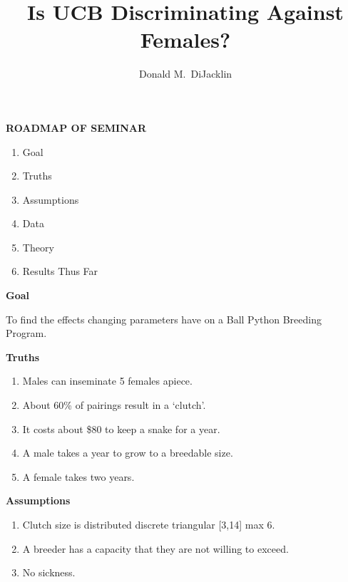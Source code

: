 \documentclass[grey,handout]{beamer}
\renewcommand{\frametitle}[1]{\begin{center}\textbf{#1}\end{center}}
\begin{document}
\title{Is UCB Discriminating Against Females?}

\author{Donald M.~DiJacklin}


\begin{frame}
  \titlepage
\end{frame}

\begin{frame}
\frametitle{ROADMAP OF SEMINAR}
  \begin{enumerate}[<+->]
    \item Goal
    \item Truths
    \item Assumptions
    \item Data
    \item Theory
    \item Results Thus Far
  \end{enumerate}
\end{frame}
\begin{frame}
\frametitle{Goal}
To find the effects changing parameters have on a Ball Python Breeding Program.
\end{frame}
\begin{frame}
\frametitle{Truths}
  \begin{enumerate}[<+->]
    \item Males can inseminate 5 females apiece.
    \item About 60\% of pairings result in a `clutch'.
    \item It costs about \$80 to keep a snake for a year.
    \item A male takes a year to grow to a breedable size.
    \item A female takes two years.
  \end{enumerate}
\end{frame}
\begin{frame}
  \frametitle{Assumptions}
  \begin{enumerate}
    \item Clutch size is distributed discrete triangular [3,14] max 6.
    \item A breeder has a capacity that they are not willing to exceed.
    \item No sickness.
  \end{enumerate}
\end{frame}


\begin{frame}
\end{frame}
\end{document}
